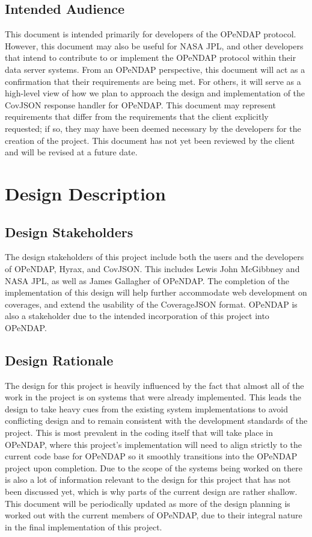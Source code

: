 \documentclass[onecolumn, draftclsnofoot,10pt, compsoc]{IEEEtran}
\begin{document}
\subsection{Intended Audience}
This document is intended primarily for developers of the \gls{OPeNDAP} protocol. However, this document may also be useful for \gls{NASA JPL}, and other developers that intend to contribute to or implement the OPeNDAP protocol within their data server systems. From an OPeNDAP perspective, this document will act as a confirmation that their requirements are being met. For others, it will serve as a high-level view of how we plan to approach the design and implementation of the CovJSON response handler for OPeNDAP. This document may represent requirements that differ from the requirements that the client explicitly requested; if so, they may have been deemed necessary by the developers for the creation of the project. This document has not yet been reviewed by the client and will be revised at a future date.

\section{Design Description}

\subsection{Design Stakeholders}
The design stakeholders of this project include both the users and the developers of OPeNDAP, Hyrax, and CovJSON. This includes Lewis John McGibbney and NASA JPL, as well as James Gallagher of OPeNDAP. The completion of the implementation of this design will help further accommodate web development on coverages, and extend the usability of the CoverageJSON format. OPeNDAP is also a stakeholder due to the intended incorporation of this project into OPeNDAP.

\subsection{Design Rationale}
The design for this project is heavily influenced by the fact that almost all of the work in the project is on systems that were already implemented. This leads the design to take heavy cues from the existing system implementations to avoid conflicting design and to remain consistent with the development standards of the project. This is most prevalent in the coding itself that will take place in OPeNDAP, where this project's implementation will need to align strictly to the current code base for OPeNDAP so it smoothly transitions into the OPeNDAP project upon completion. Due to the scope of the systems being worked on there is also a lot of information relevant to the design for this project that has not been discussed yet, which is why parts of the current design are rather shallow. This document will be periodically updated as more of the design planning is worked out with the current members of OPeNDAP, due to their integral nature in the final implementation of this project.
\end{document}
